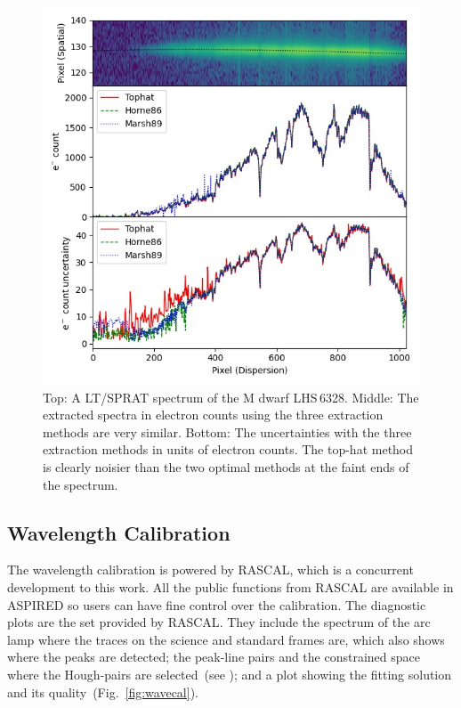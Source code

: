 \documentclass[fleqn,usenatbib]{mnras}
\begin{document}
\begin{figure}
    \centering
    \includegraphics[width=\columnwidth]{fig_04_extraction_compared.jpg}
    \caption{Top: A LT/SPRAT spectrum of the M dwarf LHS\,6328.
    Middle: The extracted spectra in electron counts using the three extraction methods
    are very similar. Bottom: The uncertainties with the three extraction methods
    in units of electron counts. The
    top-hat method is clearly noisier than the two optimal methods at the faint ends of the spectrum.}
    \label{fig:extraction_compared}
\end{figure}

\subsection{Wavelength Calibration}
The wavelength calibration is powered by \textsc{RASCAL}, which
is a concurrent development to this work. All the public
functions from \textsc{RASCAL} are available in \textsc{ASPIRED}
so users can have fine control over the calibration. The
diagnostic plots are the set provided by \textsc{RASCAL}.
They include the spectrum of the arc lamp where the traces
on the science and standard frames are, which also shows where
the peaks are detected; the peak-line pairs and the constrained
space where the Hough-pairs are
selected~(see \citealt{2020ASPC..527..627V}); and a plot showing
the fitting solution and its quality~(Fig.~\ref{fig:wavecal}).
\end{document}
